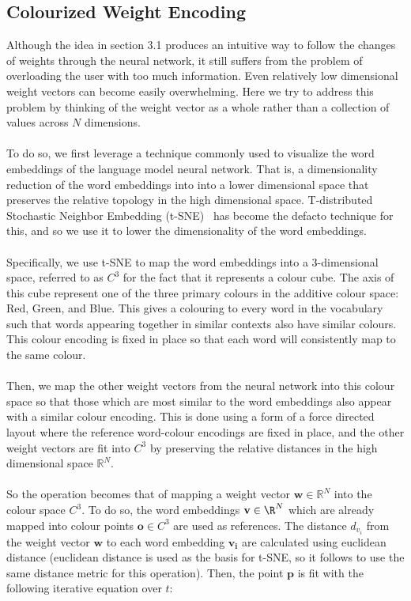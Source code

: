 \documentclass[journal]{vgtc}                %
\begin{document}
\subsection{Colourized Weight Encoding}
Although the idea in section 3.1 produces an intuitive way to follow the changes of weights through the neural network, it still suffers from the problem of overloading the user with too much information.
Even relatively low dimensional weight vectors can become easily overwhelming.
Here we try to address this problem by thinking of the weight vector as a whole rather than a collection of values across $N$ dimensions.
\\
\\
To do so, we first leverage a technique commonly used to visualize the word embeddings of the language model neural network.
That is, a dimensionality reduction of the word embeddings into into a lower dimensional space that preserves the relative topology in the high dimensional space.
T-distributed Stochastic Neighbor Embedding (t-SNE)~\cite{tsne} has become the defacto technique for this, and so we use it to lower the dimensionality of the word embeddings.
\\
\\
Specifically, we use t-SNE to map the word embeddings into a 3-dimensional space, referred to as $C^3$ for the fact that it represents a colour cube.
The axis of this cube represent one of the three primary colours in the additive colour space: Red, Green, and Blue.
This gives a colouring to every word in the vocabulary such that words appearing together in similar contexts also have similar colours.
This colour encoding is fixed in place so that each word will consistently map to the same colour.
\\
\\
Then, we map the other weight vectors from the neural network into this colour space so that those which are most similar to the word embeddings also appear with a similar colour encoding.
This is done using a form of a force directed layout where the reference word-colour encodings are fixed in place, and the other weight vectors are fit into $C^3$ by preserving the relative distances in the high dimensional space $\mathbb{R}^N$.
\\
\\
So the operation becomes that of mapping a weight vector $\mathbf{w} \in \mathbb{R}^N$ into the colour space $C^3$.
To do so, the word embeddings $\mathbf{v} \in \R^N$ which are already mapped into colour points $\mathbf{o} \in C^3$ are used as references.
The distance $d_{v_i}$ from the weight vector $\mathbf{w}$ to each word embedding $\mathbf{v_i}$ are calculated using euclidean distance (euclidean distance is used as the basis for t-SNE, so it follows to use the same distance metric for this operation).
Then, the point $\mathbf{p}$ is fit with the following iterative equation over $t$:
\end{document}

